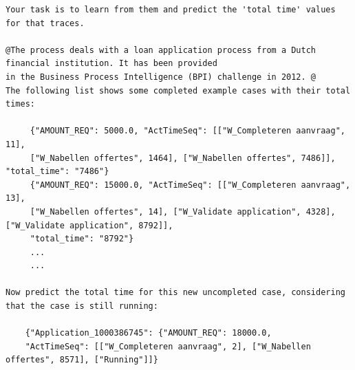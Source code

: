 \begin{lstlisting}
Your task is to learn from them and predict the 'total time' values for that traces.

@The process deals with a loan application process from a Dutch financial institution. It has been provided 
in the Business Process Intelligence (BPI) challenge in 2012. @
The following list shows some completed example cases with their total times:

     {"AMOUNT_REQ": 5000.0, "ActTimeSeq": [["W_Completeren aanvraag", 11],
     ["W_Nabellen offertes", 1464], ["W_Nabellen offertes", 7486]], "total_time": "7486"}
     {"AMOUNT_REQ": 15000.0, "ActTimeSeq": [["W_Completeren aanvraag", 13],
     ["W_Nabellen offertes", 14], ["W_Validate application", 4328], ["W_Validate application", 8792]], 
     "total_time": "8792"}
     ...
     ...
        
Now predict the total time for this new uncompleted case, considering that the case is still running:

    {"Application_1000386745": {"AMOUNT_REQ": 18000.0, 
    "ActTimeSeq": [["W_Completeren aanvraag", 2], ["W_Nabellen offertes", 8571], ["Running"]]}
\end{lstlisting}